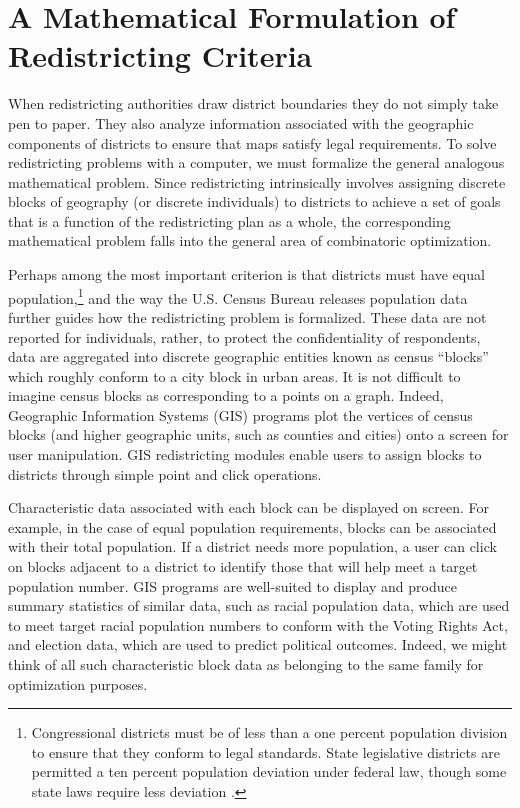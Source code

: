 \documentclass[article]{JSSstyle/jss}
\begin{document}
\section{A Mathematical Formulation of Redistricting Criteria}

When redistricting authorities draw district boundaries they do not 
simply take pen to paper.  They also analyze information associated with the geographic components of districts to ensure that maps satisfy legal requirements. 
To solve redistricting problems with a computer, we must formalize the general analogous mathematical problem.  Since redistricting 
intrinsically involves assigning discrete blocks of geography (or 
discrete individuals) to districts to achieve a set of goals that is a function 
of the redistricting plan as a whole, the corresponding mathematical 
problem falls into the general area of combinatoric optimization. 

Perhaps among the most important criterion is that districts 
must have equal population,\footnote{Congressional districts must be 
of less than a one percent population division to ensure that they 
conform to legal standards.  State legislative districts are 
permitted a ten percent population deviation under federal law, 
though some state laws require less deviation \citep[][]{CainMacMc05}
.} and the way the U.S. Census Bureau releases population data further guides how the redistricting problem is formalized.  These data are not reported for individuals, rather, to protect the 
confidentiality of respondents, data are 
aggregated into discrete geographic entities known as census 
``blocks'' which roughly conform to a city block in urban areas.  It is not difficult to imagine census blocks as corresponding to a 
points on a graph.  Indeed, Geographic Information Systems (GIS) 
programs plot the vertices of census blocks (and higher geographic 
units, such as counties and cities) onto a screen for user 
manipulation.  GIS redistricting modules enable users to assign blocks to districts through simple 
point and click operations.

Characteristic data associated with each block can be displayed 
on screen.  For example, in the case of equal population 
requirements, blocks can be associated with their total population.  
If a district needs more population, a user can click on blocks 
adjacent to a district to identify those that will help meet a 
target population number.  GIS programs are well-suited to display 
and produce summary statistics of similar data, such as racial 
population data, which are used to meet target racial population 
numbers to conform with the Voting Rights Act, and election data, 
which are used to predict political outcomes.  Indeed, we might think 
of all such characteristic block data as belonging to the same 
family for optimization purposes.
\end{document}
